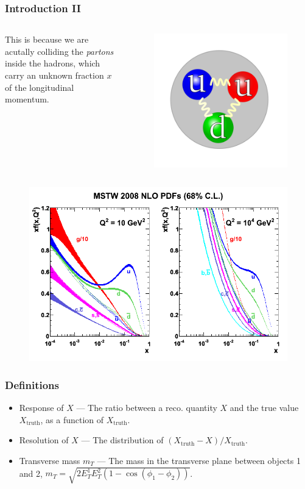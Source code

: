 \documentclass[9pt, lualatex]{beamer}
\begin{document}
\begin{frame}
    \frametitle{Introduction II}

    \begin{columns}
            This is because we are acutally colliding the \emph{partons} inside the hadrons, which carry an unknown
            fraction $x$ of the longitudinal momentum.
        \begin{figure}
            \centering
            \includegraphics[width=.5\textwidth]{proton.png}
        \end{figure}
    \end{columns}

    \begin{figure}
        \centering
        \includegraphics[width=.7\textwidth]{pdf.png}
    \end{figure}

\end{frame}

\begin{frame}
    \frametitle{Definitions}
    \begin{itemize}
        \item Response of $X$ --- The ratio between a reco. quantity $X$ and the true value $X_\text{truth}$, as a function of $X_\text{truth}$.
        \item Resolution of $X$ --- The distribution of $(X_\text{truth} - X)/X_\text{truth}$.
        \item Transverse mass $m_T$ --- The mass in the transverse plane between objects 1 and 2, $m_T = \sqrt{2E_T^1E_T^2(1 - \cos(\phi_1 - \phi_2))}$.
    \end{itemize}
\end{frame}
\end{document}
